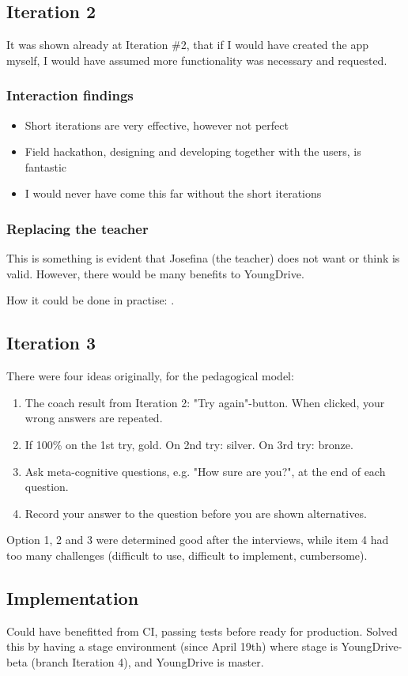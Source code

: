 \subsection{Iteration 2}
It was shown already at Iteration \#2, that if I would have created the app myself, I would have assumed more functionality was necessary and requested.

\subsubsection{Interaction findings}
\begin{itemize}
\item Short iterations are very effective, however not perfect
\item Field hackathon, designing and developing together with the users, is fantastic
\item I would never have come this far without the short iterations
\end{itemize}

\subsubsection{Replacing the teacher}
This is something is evident that Josefina (the teacher) does not want or think is valid. However, there would be many benefits to YoungDrive.

How it could be done in practise: .

\subsection{Iteration 3}

There were four ideas originally, for the pedagogical model:

\begin{enumerate}
\item The coach result from Iteration 2: "Try again"-button. When clicked, your wrong answers are repeated.
\item If 100\% on the 1st try, gold. On 2nd try: silver. On 3rd try: bronze.
\item Ask meta-cognitive questions, e.g. "How sure are you?", at the end of each question.
\item Record your answer to the question before you are shown alternatives.
\end{enumerate}

Option 1, 2 and 3 were determined good after the interviews, while item 4 had too many challenges (difficult to use, difficult to implement, cumbersome).

\subsection{Implementation}
Could have benefitted from CI, passing tests before ready for production. Solved this by having a stage environment (since April 19th) where stage is YoungDrive-beta (branch Iteration 4), and YoungDrive is master.

